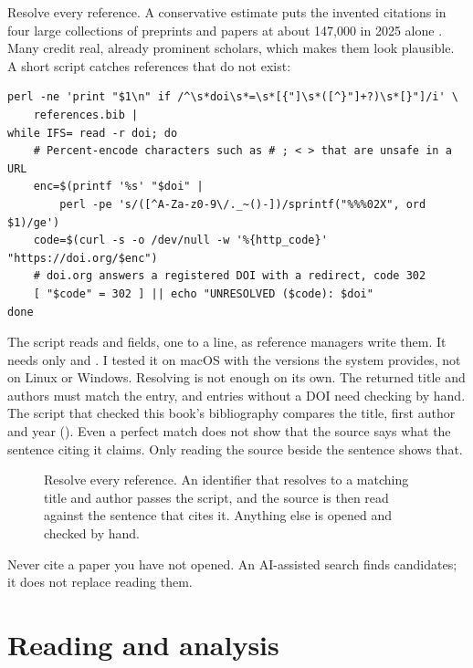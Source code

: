 Resolve every reference. A conservative estimate puts the invented citations
in four large collections of preprints and papers at about 147,000 in 2025
alone \parencite{zhao2026citations}. Many credit real, already prominent
scholars, which makes them look plausible. A short script catches references
that do not exist:

\begin{lstlisting}[style=shell,caption={Resolve every DOI before it enters a manuscript}]
perl -ne 'print "$1\n" if /^\s*doi\s*=\s*[{"]\s*([^}"]+?)\s*[}"]/i' \
    references.bib |
while IFS= read -r doi; do
    # Percent-encode characters such as # ; < > that are unsafe in a URL
    enc=$(printf '%s' "$doi" |
        perl -pe 's/([^A-Za-z0-9\/._~()-])/sprintf("%%%02X", ord $1)/ge')
    code=$(curl -s -o /dev/null -w '%{http_code}' "https://doi.org/$enc")
    # doi.org answers a registered DOI with a redirect, code 302
    [ "$code" = 302 ] || echo "UNRESOLVED ($code): $doi"
done
\end{lstlisting}

The script reads  and  fields, one to a
line, as reference managers write them. It needs only \code{perl} and
\code{curl}. I tested it on macOS with the versions the system provides, not
on Linux or Windows. Resolving is not enough on its own. The returned title and authors must match the entry,
and entries without a DOI need checking by hand. The script that checked this
book's bibliography compares the title, first author and year
(). Even a perfect match does not show that the source says
what the sentence citing it claims. Only reading the source beside the
sentence shows that.

\begin{figure}[htbp]
\centering
{}
\caption{Resolve every reference. An identifier that resolves to a matching
title and author passes the script, and the source is then read against the
sentence that cites it. Anything else is opened and checked by hand.}
\label{fig:resolve}
\end{figure}

\begin{keypoint}
Never cite a paper you have not opened. An AI-assisted search finds candidates;
it does not replace reading them.
\end{keypoint}

\section{Reading and analysis}

